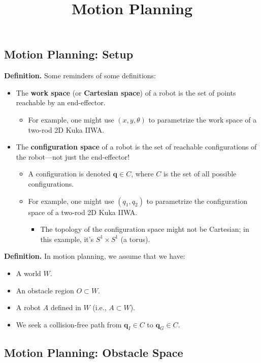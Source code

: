 \title{Motion Planning}



\subsection{Motion Planning: Setup}

\textbf{Definition.}
Some reminders of some definitions:
\begin{itemize}
    \item The \textbf{work space} (or \textbf{Cartesian space}) of a robot
    is the set of points reachable by an end-effector.
    \begin{itemize}
        \item For example, one might use $(x, y, \theta)$ to parametrize
        the work space of a two-rod 2D Kuka IIWA.
    \end{itemize}
    \item The \textbf{configuration space} of a robot
    is the set of reachable configurations of the robot---not just
    the end-effector!
    \begin{itemize}
        \item A configuration is denoted $\mathbf{q} \in C$,
        where $C$ is the set of all possible configurations.
        \item For example, one might use $(q_1, q_2)$ to parametrize
        the configuration space of a two-rod 2D Kuka IIWA.
        \begin{itemize}
            \item The topology of the configuration space
            might not be Cartesian; in this example,
            it's $S^1 \times S^1$ (a torus).
        \end{itemize}
    \end{itemize}
\end{itemize}

\textbf{Definition.}
In motion planning, we assume that we have:
\begin{itemize}
    \item A world $W$.
    \item An obstacle region $O \subset W$.
    \item A robot $A$ defined in $W$ (i.e., $A \subset W$).
    \item We seek a collision-free path from
    $\mathbf{q}_I \in C$ to $\mathbf{q}_G \in C$.
\end{itemize}

\subsection{Motion Planning: Obstacle Space}

